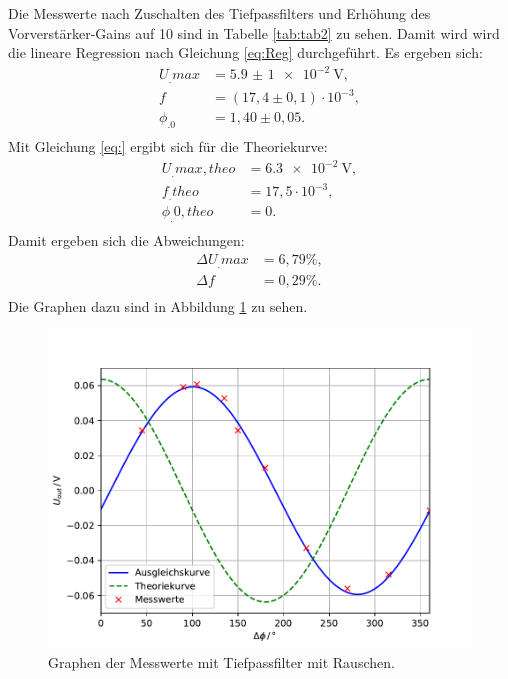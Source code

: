 \noindent Die Messwerte nach Zuschalten des Tiefpassfilters und Erhöhung des Vorverstärker-Gains auf 10 sind in Tabelle \ref{tab:tab2} zu sehen. Damit wird wird die lineare Regression nach Gleichung \eqref{eq:Reg} durchgeführt.
Es ergeben sich:
\begin{align*}
U_.{max} &= \SI{5,9(1)e-2}{\volt} ,\\
f 		 &= (17,4\pm0,1)\cdot 10^{-3} ,\\
\phi_.0  &= 1,40\pm0,05 \text{.}\\
\end{align*}
Mit Gleichung \eqref{eq:} ergibt sich für die Theoriekurve:
\begin{align*}
U_.{max,theo} &= \SI{6,3e-2}{\volt} ,\\
f_.{theo}	  &= 17,5\cdot 10^{-3} ,\\
\phi_.{0,theo}&= 0 \text{.}\\
\end{align*}
Damit ergeben sich die Abweichungen:
\begin{align*}
\Delta U_.{max} &= 6,79\% ,\\
\Delta f		&= 0,29\% \text{.}\\
\end{align*}
Die Graphen dazu sind in Abbildung \ref{fig:U4} zu sehen.

\begin{figure}
\centering
\includegraphics[width=\linewidth-75pt,height=\textheight-75pt,keepaspectratio]{content/images/plot2.pdf}
\caption{Graphen der Messwerte mit Tiefpassfilter mit Rauschen.}\label{fig:U4}
\end{figure}


